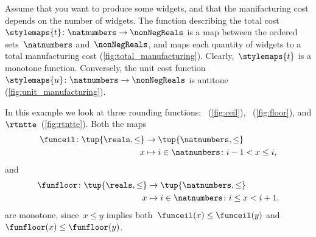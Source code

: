 \begin{example}
    Assume that you want to produce some widgets, and that the manifacturing cost depends on the number of widgets.
    The function describing the total cost~$\stylemaps{t}\colon \natnumbers\to \nonNegReals$ is a map between the ordered sets~$\natnumbers$ and~$\nonNegReals$, and maps each quantity of widgets to a total manufacturing cost (\cref{fig:total_manufacturing}).
    Clearly,~$\stylemaps{t}$ is a monotone function.
    Conversely, the unit cost function~$\stylemaps{u}\colon \natnumbers\to \nonNegReals$ is antitone (\cref{fig:unit_manufacturing}).
\end{example}

\begin{figure}[h!]
\end{figure}

\begin{example}
    \label{ex:rounding-functions}
    In this example we look at three rounding functions: \funceil~(\cref{fig:ceil}), \funfloor~(\cref{fig:floor}), and $\rtntte$~(\cref{fig:rtntte}).
    Both the maps
    \begin{equation*}
        \begin{aligned}
            \funceil\colon \tup{\reals,\leq} & \to \tup{\natnumbers,\leq} \\
            x                                & \mapsto i \in \natnumbers \colon i-1<x\leq i,
        \end{aligned}
    \end{equation*}
    and
    \begin{equation*}
        \begin{aligned}
            \funfloor\colon \tup{\reals,\leq} & \to \tup{\natnumbers,\leq} \\
            x                                 & \mapsto i \in \natnumbers \colon i\leq x< i+1.
        \end{aligned}
    \end{equation*}
    are monotone, since~$x\leq y$ implies both~$\funceil(x)\leq \funceil(y)$ and~$\funfloor(x)\leq\funfloor(y)$.
    \begin{figure*}[h!]
        \centering
        \hfill
        \hfill
    \end{figure*}
\end{example}

